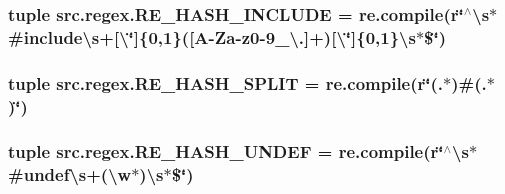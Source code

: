 \hypertarget{namespacesrc_1_1regex_ac256d6d206de3cdbdcc838d46f3dc8d8}{
\subsubsection[{R\-E\-\_\-\-H\-A\-S\-H\-\_\-\-I\-N\-C\-L\-U\-D\-E}]{\setlength{\rightskip}{0pt plus 5cm}tuple src.\-regex.\-R\-E\-\_\-\-H\-A\-S\-H\-\_\-\-I\-N\-C\-L\-U\-D\-E = re.\-compile(r\char`\"{}$^\wedge$\textbackslash{}s$\ast$\#include\textbackslash{}s+\mbox{[}\textbackslash{}\char`\"{}\mbox{]}\{0,1\}(\mbox{[}A-\/Za-\/z0-\/9\-\_\-\textbackslash{}.\mbox{]}+)\mbox{[}\textbackslash{}\char`\"{}\mbox{]}\{0,1\}\textbackslash{}s$\ast$\$\char`\"{})}}\label{namespacesrc_1_1regex_ac256d6d206de3cdbdcc838d46f3dc8d8}
\hypertarget{namespacesrc_1_1regex_ae7a763293a55cb767e2fd3abd69247a1}{
\subsubsection[{R\-E\-\_\-\-H\-A\-S\-H\-\_\-\-S\-P\-L\-I\-T}]{\setlength{\rightskip}{0pt plus 5cm}tuple src.\-regex.\-R\-E\-\_\-\-H\-A\-S\-H\-\_\-\-S\-P\-L\-I\-T = re.\-compile(r\char`\"{}(.$\ast$)\#(.$\ast$)\char`\"{})}}\label{namespacesrc_1_1regex_ae7a763293a55cb767e2fd3abd69247a1}
\hypertarget{namespacesrc_1_1regex_a0fc6ae328989750bba3349fe8c74d419}{
\subsubsection[{R\-E\-\_\-\-H\-A\-S\-H\-\_\-\-U\-N\-D\-E\-F}]{\setlength{\rightskip}{0pt plus 5cm}tuple src.\-regex.\-R\-E\-\_\-\-H\-A\-S\-H\-\_\-\-U\-N\-D\-E\-F = re.\-compile(r\char`\"{}$^\wedge$\textbackslash{}s$\ast$\#undef\textbackslash{}s+(\textbackslash{}w$\ast$)\textbackslash{}s$\ast$\$\char`\"{})}}\label{namespacesrc_1_1regex_a0fc6ae328989750bba3349fe8c74d419}
